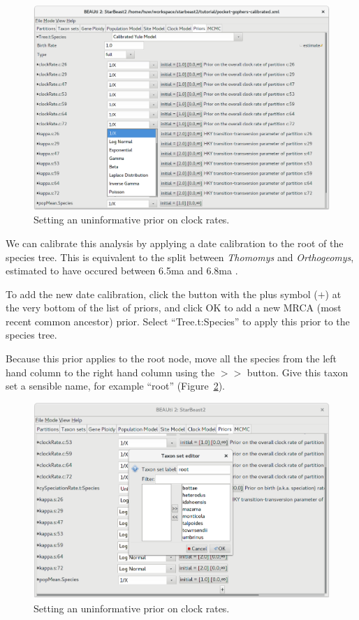 \documentclass{article}
\begin{document}
\begin{figure}[htb!]
\centering
\includegraphics[width=\textwidth]{figures/beauti-jeffreys.png}
\caption{Setting an uninformative prior on clock rates.}
\label{fig:jeffreys}
\end{figure}

\clearpage

We can calibrate this analysis by applying a date calibration to the root of
the species tree. This is equivalent to the split between
\textit{Thomomys} and \textit{Orthogeomys}, estimated to have occured between
6.5ma and 6.8ma \citep{Belfiore01042008}.

To add the new date calibration, click the button with the plus symbol ($+$)
at the very bottom of the list of priors, and click OK to add a new MRCA (most
recent common ancestor) prior. Select ``Tree.t:Species'' to apply this prior
to the species tree.

Because this prior applies to the root node, move all the species from the left
hand column to the right hand column using the $>>$ button. Give this taxon set
a sensible name, for example ``root'' (Figure~\ref{fig:mrca-taxonset}).

\begin{figure}[htb!]
\centering
\includegraphics[width=\textwidth]{figures/beauti-mrca-taxonset.png}
\caption{Setting an uninformative prior on clock rates.}
\label{fig:mrca-taxonset}
\end{figure}
\end{document}
